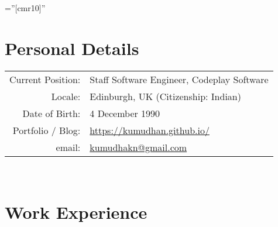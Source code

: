 \documentclass[a4paper,10pt]{article} %
\begin{document}
\pagestyle{empty} %

\font\fb=''[cmr10]'' %


\par{\bigskip\par} %

\section{Personal Details}
\begin{tabular}{rl}
Current Position: & Staff Software Engineer, Codeplay Software \\
Locale: & Edinburgh, UK (Citizenship: Indian)\\
Date of Birth: & 4 December 1990 \\
Portfolio / Blog: & \href{https://kumudhan.github.io/}{https://kumudhan.github.io/}\\
email: & \href{mailto:kumudhakn@gmail.com}{kumudhakn@gmail.com}\\ 
\end{tabular}
\\

\section{Work Experience}
\end{document}
